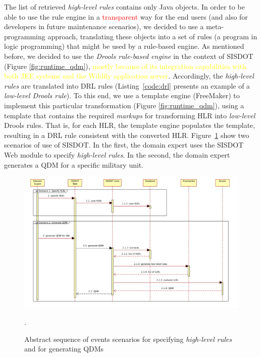 \documentclass[AMA,STIX1COL,hidelinks]{WileyNJD-v2}
\newcommand{\callers}{\emph{high-level rules}\xspace}
\newcommand{\shc}{HLR\xspace}
\begin{document}
The list of retrieved \callers contains only Java objects. In order to be able to use the rule engine in a \textcolor{red}{transparent} way for the end users (and also for developers in future maintenance scenarios), we decided to use a meta-programming approach, translating these objects into a set of rules (a program in logic programming) that might be used by a rule-based engine. As mentioned before, we decided to use the \emph{Drools rule-based engine} in the context of SISDOT (Figure \ref{fig:runtime_qdm}), \textcolor{yellow}{mostly because of its integration capabilities with both JEE systems and the Wildfly application server}. Accordingly, the \callers are translated into DRL rules (Listing~\ref{code:drl} presents an example of a \emph{low-level Drools rule}). To this end, we use a template engine (FreeMaker) to implement this particular transformation (Figure \ref{fig:runtime_qdm}), using a template that contains the required \emph{markups} for transforming \shc into \emph{low-level} Drools rules. That is, for each \shc, the template engine populates the template, resulting in a DRL rule consistent with the converted \shc. Figure~\ref{fig:seq-diagram} show two scenarios of use of SISDOT. In the first, the domain expert uses the SISDOT Web module to specify \callers. In the second, the domain expert generates a QDM for a specific military unit.

\begin{figure}[htb]
  \includegraphics[scale=0.65]{img/diagram.pdf}
  \caption{Abstract sequence of
    events scenarios for specifying \callers and for generating QDMs}.
  \label{fig:seq-diagram} 
\end{figure}

\end{document}
